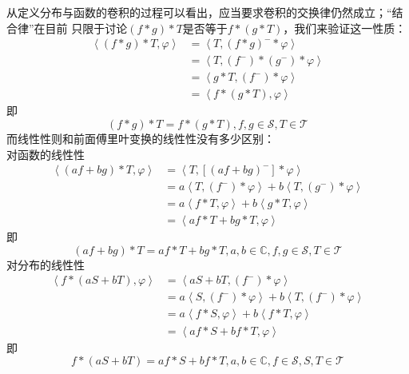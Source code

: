从定义分布与函数的卷积的过程可以看出，应当要求卷积的交换律仍然成立；“结合律”在目前
只限于讨论$(f*g)*T$是否等于$f*(g*T)$，我们来验证这一性质：
\begin{align*}
    \left\langle (f*g)*T,\varphi\right\rangle & =\left\langle T,(f*g)^- *\varphi\right\rangle\\
    & =\left\langle T,(f^-)*(g^-)*\varphi\right\rangle\\
    & =\left\langle g*T,(f^-)*\varphi\right\rangle\\
    & =\left\langle f*(g*T),\varphi\right\rangle
\end{align*}
即\[(f*g)*T=f*(g*T),f,g\in\mathcal{S} ,T\in\mathcal{T}\]
而线性性则和前面傅里叶变换的线性性没有多少区别：\\
对函数的线性性
\begin{align*}
    \left\langle (af+bg)*T,\varphi\right\rangle & =\left\langle T,[(af+bg)^-]*\varphi\right\rangle                                               \\
                                     & =a\left\langle T,(f^-)*\varphi\right\rangle+b\left\langle T,(g^-)*\varphi\right\rangle                    \\
                                     & =a\left\langle f*T,\varphi\right\rangle+b\left\langle g*T,\varphi\right\rangle                            \\
                                     & =\left\langle af*T+bg*T,\varphi\right\rangle
\end{align*}
即\[(af+bg)*T=af*T+bg*T,a,b\in\mathbb{C},f,g\in\mathcal{S} ,T\in\mathcal{T} \]
{\parskip=0pt  对分布的线性性}
\begin{align*}
    \left\langle f*(aS+bT),\varphi\right\rangle & =\left\langle aS+bT,(f^-)*\varphi\right\rangle                                                 \\
                                     & =a\left\langle S,(f^-)*\varphi\right\rangle+b\left\langle T,(f^-)*\varphi\right\rangle                    \\
                                     & =a\left\langle f*S,\varphi\right\rangle+b\left\langle f*T,\varphi\right\rangle                            \\
                                     & =\left\langle af*S+bf*T,\varphi\right\rangle
\end{align*}
即\[f*(aS+bT)=af*S+bf*T,a,b\in\mathbb{C},f\in\mathcal{S} ,S,T\in\mathcal{T}\]

